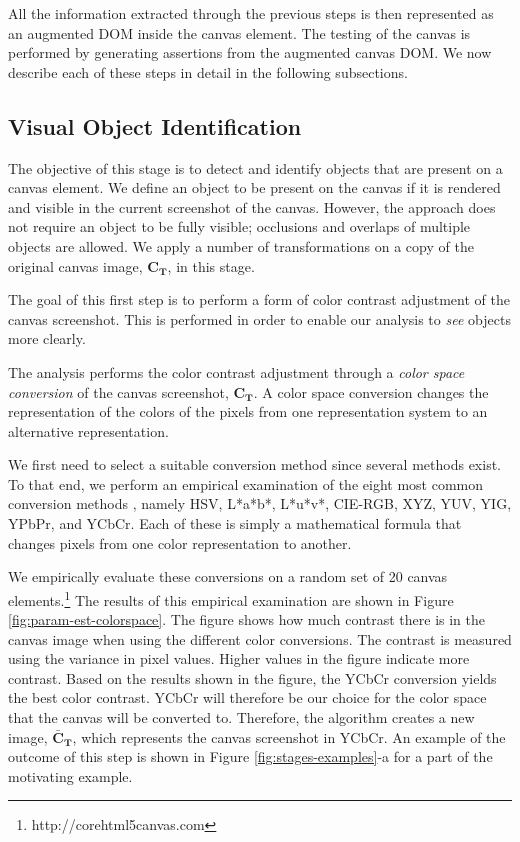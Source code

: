 All the information extracted through the previous steps is then represented as an augmented DOM inside the canvas element.
The testing of the canvas is performed by generating assertions from the augmented canvas DOM.
We now describe each of these steps in detail in the following subsections.
 

\subsection{Visual Object Identification}
\label{subsec:viz-identification}
The objective of this stage is to detect and identify objects that are present on a canvas element.
We define an object to be present on the canvas if it is rendered and visible in the current screenshot of the canvas.
However, the approach does not require an object to be fully visible; occlusions and overlaps of multiple objects are allowed.
We apply a number of transformations on a copy of the original canvas image, $\mathbf{C_T}$, in this stage.

The goal of this first step is to perform a form of color contrast adjustment of the canvas screenshot.
This is performed in order to enable our analysis to \emph{see} objects more clearly. 

The analysis performs the color contrast adjustment through a \emph{color space conversion} of the canvas screenshot,  $\mathbf{C_T}$.
A color space conversion changes the representation of the colors of the pixels from one representation system to an alternative representation. 

We first need to select a suitable conversion method since several methods exist.
To that end, we perform an empirical examination of the eight most common conversion methods \cite{tooms2016colour}, namely HSV, L*a*b*, L*u*v*, CIE-RGB, XYZ, YUV, YIG, YPbPr, and YCbCr.
Each of these is simply a mathematical formula \cite{tooms2016colour} that changes pixels from one color representation to another. 

We empirically evaluate these conversions on a random set of 20 canvas elements.\footnote{http://corehtml5canvas.com} The results of this empirical examination are shown in Figure \ref{fig:param-est-colorspace}.
The figure shows how much contrast there is in the canvas image when using the different color conversions. The contrast is measured using 
the variance in pixel values. Higher values in the figure indicate  more contrast. Based on the results shown in the figure, the YCbCr conversion yields the best color contrast.
YCbCr will therefore be our choice for the color space that the canvas will be converted to.
Therefore, the algorithm creates a new image, $\mathbf{\bar{C}_T}$, which represents the canvas screenshot in YCbCr.
An example of the outcome of this step is shown in Figure \ref{fig:stages-examples}-a for a part of the motivating example.


